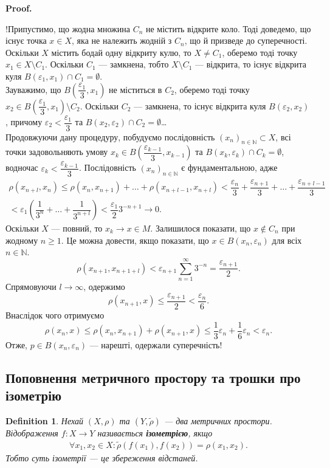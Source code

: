 \documentclass[a4paper, 10pt]{article}
\makeatletter
\theoremstyle{theoremdd}
\theoremstyle{theoremdd}
\newtheorem{definition}[theorem]{Definition}
\theoremstyle{theoremdd}
\theoremstyle{theoremdd}
\theoremstyle{theoremdd}
\theoremstyle{theoremdd}
\theoremstyle{theoremdd}
\theoremstyle{theoremdd}
\renewenvironment{proof}[1][Proof.\\]{\par
\pushQED{\hfill \qed}%
\normalfont \topsep6\p@\@plus6\p@\relax
\trivlist
\item\relax
{\bfseries
#1\@addpunct{.}}\hspace\labelsep\ignorespaces
}{%
\popQED\endtrivlist\@endpefalse
}
\makeatother
\begin{document}
\begin{proof}
!Припустимо, що жодна множина $C_n$ не містить відкрите коло. Тоді доведемо, що існує точка $x \in X$, яка не належить жодній з $C_n$, що й призведе до суперечності.\\
Оскільки $X$ містить бодай одну відкриту кулю, то $X \neq C_1$, оберемо тоді точку $x_1 \in X \setminus C_1$. Оскільки $C_1$ --- замкнена, тобто $X \setminus C_1$ --- відкрита, то існує відкрита куля $B(\varepsilon_1,x_1) \cap C_1 = \emptyset$.\\
Зауважимо, що $B\left( \dfrac{\varepsilon_1}{3}, x_1 \right)$ не міститься в $C_2$, оберемо тоді точку $x_2 \in B\left( \dfrac{\varepsilon_1}{3}, x_1 \right) \setminus C_2$. Оскільки $C_2$ --- замкнена, то існує відкрита куля $B(\varepsilon_2,x_2)$, причому $\varepsilon_2 < \dfrac{\varepsilon_1}{3}$ та $B(x_2,\varepsilon_2) \cap C_2 = \emptyset$\dots \\
Продовжуючи дану процедуру, побудуємо послідовність $(x_n)_{n \in \mathbb{N}} \subset X$, всі точки задовольняють умову $x_k \in B\left( \dfrac{\varepsilon_{k-1}}{3}, x_{k-1}\right)$ та $B(x_k,\varepsilon_k) \cap C_k = \emptyset$, водночас $\varepsilon_k < \dfrac{\varepsilon_{k-1}}{3}$. Послідовність $(x_n)_{n \in \mathbb{N}}$ є фундаментальною, адже
\begin{multline*}
\rho(x_{n+l}, x_n) \leq \rho(x_n, x_{n+1}) + \dots + \rho(x_{n+l-1}, x_{n+l}) < \dfrac{\varepsilon_n}{3} + \dfrac{\varepsilon_{n+1}}{3} + \dots + \dfrac{\varepsilon_{n+l-1}}{3} \\
< \varepsilon_1 \left( \dfrac{1}{3^n} + \dots + \dfrac{1}{3^{n+l}} \right) < \dfrac{\varepsilon_1}{2} 3^{-n+1} \to 0.
\end{multline*}
Оскільки $X$ --- повний, то $x_k \to x \in M$. Залишилося показати, що $x \notin C_n$ при жодному $n \geq 1$. Це можна довести, якщо показати, що $x \in B(x_n,\varepsilon_n)$ для всіх $n \in \mathbb{N}$.
\[
\rho(x_{n+1}, x_{n+1+l}) < \varepsilon_{n+1} \sum_{n=1}^\infty 3^{-n} = \dfrac{\varepsilon_{n+1}}{2}.
\]
Спрямовуючи $l \to \infty$, одержимо
\[
\rho(x_{n+1},x) \leq \dfrac{\varepsilon_{n+1}}{2} < \dfrac{\varepsilon_n}{6}.
\]
Внаслідок чого отримуємо
\[
\rho(x_n,x) \leq \rho(x_n,x_{n+1}) + \rho(x_{n+1},x) \leq \dfrac{1}{3} \varepsilon_n + \dfrac{1}{6} \varepsilon_n < \varepsilon_n.
\]
Отже, $p \in B(x_n,\varepsilon_n)$ --- нарешті, одержали суперечність!
\end{proof}

\subsection{Поповнення метричного простору та трошки про ізометрію}
\begin{definition}
Нехай $(X,\rho)$ та $(Y, \tilde{\rho})$ --- два метричних простори.\\
Відображення $f \colon X \to Y$ називається \textbf{ізометрією}, якщо
\begin{align*}
\forall x_1,x_2 \in X: \tilde{\rho}(f(x_1),f(x_2)) = \rho(x_1,x_2).
\end{align*}
Тобто суть ізометрії --- це збереження відстаней.
\end{definition}
\end{document}
